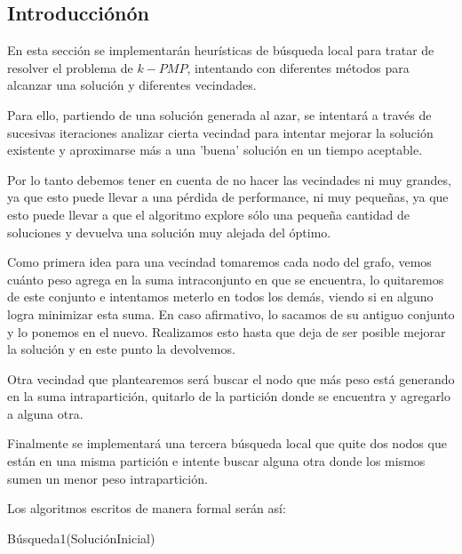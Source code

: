 \subsection{Introducción\'on}

En esta sección se implementarán heurísticas de búsqueda local para tratar de resolver el problema de $k-PMP$, intentando con diferentes métodos para alcanzar una solución y diferentes vecindades.

Para ello, partiendo de una solución generada al azar, se intentará a través de sucesivas iteraciones analizar cierta vecindad para intentar mejorar la solución existente y aproximarse más a una 'buena' solución en un tiempo aceptable. 

Por lo tanto debemos tener en cuenta de no hacer las vecindades ni muy grandes, ya que esto puede llevar a una pérdida de performance, ni muy pequeñas, ya que esto puede llevar a que el algoritmo explore sólo una pequeña cantidad de soluciones y devuelva una solución muy alejada del óptimo.

Como primera idea para una vecindad tomaremos cada nodo del grafo, vemos cuánto peso agrega en la suma intraconjunto en que se encuentra, lo quitaremos de este conjunto e intentamos meterlo en todos los demás, viendo si en alguno logra minimizar esta suma. En caso afirmativo, lo sacamos de su antiguo conjunto y lo ponemos en el nuevo. Realizamos esto hasta que deja de ser posible mejorar la solución y en este punto la devolvemos.


Otra vecindad que plantearemos será buscar el nodo que más peso está generando en la suma intrapartición, quitarlo de la partición donde se encuentra y agregarlo a alguna otra.

Finalmente se implementará una tercera búsqueda local que quite dos nodos que están en una misma partición e intente buscar alguna otra donde los mismos sumen un menor peso intrapartición.

Los algoritmos escritos de manera formal serán así:

\begin{algorithm}
  	\begin{algorithmic}[1]\parskip=1mm
		 \caption{ Búsqueda1(SoluciónInicial) }
	\end{algorithmic}
\end{algorithm}

